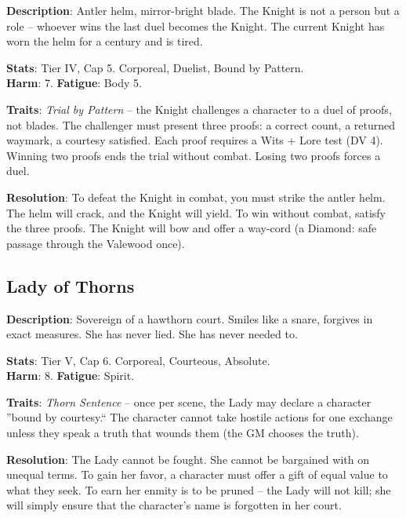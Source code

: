 \noindent\textbf{Description}: Antler helm, mirror-bright blade. The Knight is not a person but a role -- whoever wins the last duel becomes the Knight. The current Knight has worn the helm for a century and is tired.

\noindent\textbf{Stats}: Tier IV, Cap 5. Corporeal, Duelist, Bound by Pattern.\\
\textbf{Harm}: 7. \textbf{Fatigue}: Body 5.

\noindent\textbf{Traits}: 
\emph{Trial by Pattern} -- the Knight challenges a character to a duel of proofs, not blades. The challenger must present three proofs: a correct count, a returned waymark, a courtesy satisfied. Each proof requires a Wits + Lore test (DV 4). Winning two proofs ends the trial without combat. Losing two proofs forces a duel.

\noindent\textbf{Resolution}: To defeat the Knight in combat, you must strike the antler helm. The helm will crack, and the Knight will yield. To win without combat, satisfy the three proofs. The Knight will bow and offer a way-cord (a Diamond: safe passage through the Valewood once).

\subsection*{Lady of Thorns}

\noindent\textbf{Description}: Sovereign of a hawthorn court. Smiles like a snare, forgives in exact measures. She has never lied. She has never needed to.

\noindent\textbf{Stats}: Tier V, Cap 6. Corporeal, Courteous, Absolute.\\
\textbf{Harm}: 8. \textbf{Fatigue}: Spirit.

\noindent\textbf{Traits}: 
\emph{Thorn Sentence} -- once per scene, the Lady may declare a character ''bound by courtesy.`` The character cannot take hostile actions for one exchange unless they speak a truth that wounds them (the GM chooses the truth).

\noindent\textbf{Resolution}: The Lady cannot be fought. She cannot be bargained with on unequal terms. To gain her favor, a character must offer a gift of equal value to what they seek. To earn her enmity is to be pruned -- the Lady will not kill; she will simply ensure that the character's name is forgotten in her court.


